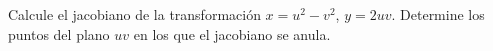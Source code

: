 Calcule el jacobiano de la transformación $x=u^2-v^2$, $y=2uv$. Determine los puntos del plano $uv$ en los que el jacobiano se anula.
